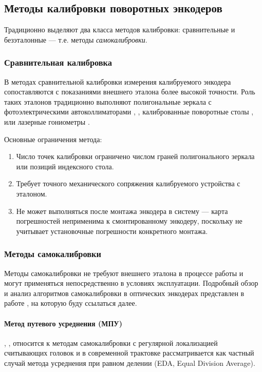 \subsection{Методы калибровки поворотных энкодеров}

Традиционно выделяют два класса методов калибровки: сравнительные и безэталонные --- т.е. методы \textit{самокалибровки}.

\subsubsection{Сравнительная калибровка}

В методах сравнительной калибровки измерения калибруемого энкодера сопоставляются с показаниями внешнего эталона более высокой точности. Роль таких эталонов традиционно выполняют полигональные зеркала с фотоэлектрическими автоколлиматорами \cite{24gon}, \cite{polygon}, калиброванные поворотные столы \cite{table}, \cite{table_guide} или лазерные гониометры \cite{gonio}.

Основные ограничения метода:
\begin{enumerate}
    \item Число точек калибровки ограничено числом граней полигонального зеркала или позиций индексного стола.
    \item Требует точного механического сопряжения калибруемого устройства с эталоном.
    \item Не может выполняться после монтажа энкодера в систему --- карта погрешностей неприменима к смонтированному энкодеру, поскольку не учитывает установочные погрешности конкретного монтажа.
\end{enumerate}

\subsubsection{Методы самокалибровки} \label{subsubsec:selfcal}

Методы самокалибровки не требуют внешнего эталона в процессе работы и могут применяться непосредственно в условиях эксплуатации. Подробный обзор и анализ алгоритмов самокалибровки
в оптических энкодерах представлен в работе \cite{kiryanov-overview}, на которую буду ссылаться далее.

\paragraph{Метод путевого усреднения (МПУ)}\label{par:avg_path_method} \cite{mpu-ionak}, \cite{mpu-bachish}, \cite{cramer} относится к методам самокалибровки с регулярной локализацией считывающих головок и в современной трактовке рассматривается как частный случай метода усреднения при равном делении (EDA, Equal Division Average).

